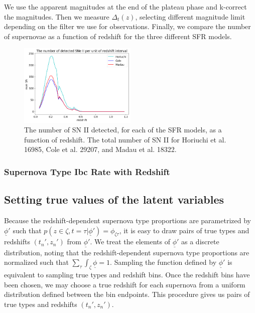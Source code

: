 \documentclass[12pt, onecolumn]{emulateapj}
\newcommand{\textul}{\underline}
\begin{document}
We use the apparent magnitudes at the end of the plateau phase and k-correct the magnitudes. Then we measure $\Delta_t(z)$, selecting different magnitude limit depending on the filter we use for observations. Finally, we compare the number of supernovae as a function of redshift for the three different SFR models.

\begin{figure}
	\begin{center}
		\includegraphics[width=0.5\textwidth]{number_SNII_withmagntiudescatter.png}
		\caption{The number of SN II detected, for each of the SFR models, as a function of redshift. The total number of SN II for Horiuchi et al. 16985, Cole et al. 29207, and Madau et al.  18322. }
		\label{fig:SNII_lc_wz}
	\end{center}
\end{figure}

\subsubsection{Supernova Type Ibc Rate with Redshift}
\label{sec:TypeIbcRate}
 
\subsection{Setting true values of the latent variables}
\label{sec:true_latents}

Because the redshift-dependent supernova type proportions are parametrized by $\textul{\phi}'$ such that $p(z\in\zeta, t=\tau | \textul{\phi}') = \phi_{\zeta\tau}$, it is easy to draw pairs of true types and redshifts $(t_{n}', z_{n}')$ from $\textul{\phi}'$.  We treat the elements of $\textul{\phi}'$ as a discrete distribution, noting that the redshift-dependent supernova type proportions are normalized such that $\sum_{\tau}\int_{\zeta}\textul{\phi}=1$.  Sampling the function defined by $\textul{\phi}'$ is equivalent to sampling true types and redshift bins.  Once the redshift bins have been chosen, we may choose a true redshift for each supernova from a uniform distribution defined between the bin endpoints.  This procedure gives us pairs of true types and redshifts $(t_{n}', z_{n}')$.
\end{document}
